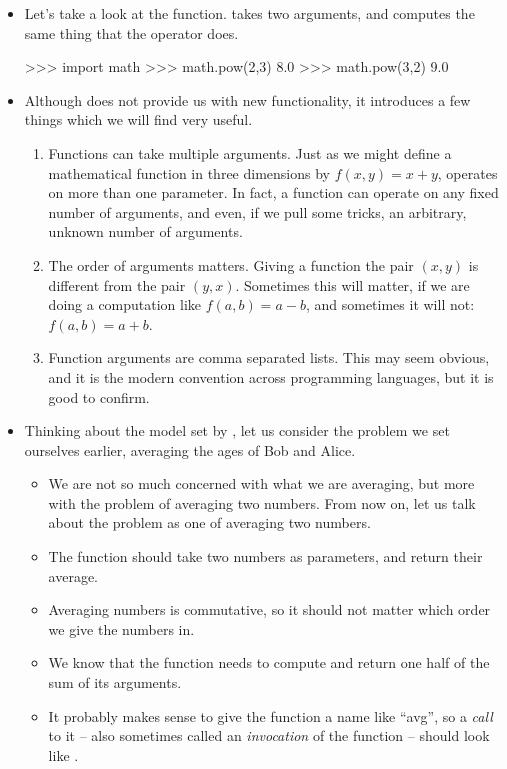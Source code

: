 \begin{itemize}
    \item Let's take a look at the  function.
         takes two arguments, and computes the same thing that the \code{**} operator does.
\begin{codeblock}
>>> import math
>>> math.pow(2,3)
8.0
>>> math.pow(3,2)
9.0
\end{codeblock}
    \item Although  does not provide us with new functionality, it introduces a few things which we will find very useful.
        \begin{enumerate}
            \item Functions can take multiple arguments.
                Just as we might define a mathematical function in three dimensions by $f(x,y) = x+y$,  operates on more than one parameter.
                In fact, a function can operate on any fixed number of arguments, and even, if we pull some tricks, an arbitrary, unknown number of arguments.
            \item The order of arguments matters.
                Giving a function the pair $(x,y)$ is different from the pair $(y,x)$.
                Sometimes this will matter, if we are doing a computation like $f(a,b) = a - b$, and sometimes it will not: $f(a,b) = a+b$.
            \item Function arguments are comma separated lists.
                This may seem obvious, and it is the modern convention across programming languages, but it is good to confirm.
        \end{enumerate}
    \item Thinking about the model set by , let us consider the problem we set ourselves earlier, averaging the ages of Bob and Alice.
        \begin{itemize}
            \item We are not so much concerned with what we are averaging, but more with the problem of averaging two numbers.
                From now on, let us talk about the problem as one of averaging two numbers.
            \item The function should take two numbers as parameters, and return their average.
            \item Averaging numbers is commutative, so it should not matter which order we give the numbers in.
            \item We know that the function needs to compute and return one half of the sum of its arguments.
            \item It probably makes sense to give the function a name like ``avg'', so a \emph{call} to it -- also sometimes called an \emph{invocation} of the function -- should look like .
        \end{itemize}
\end{itemize}

